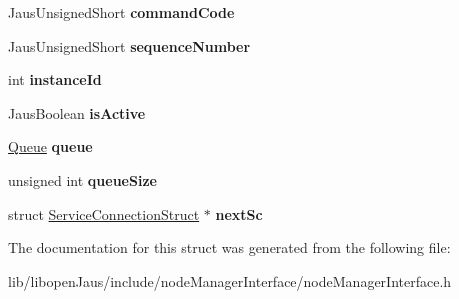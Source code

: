 \begin{DoxyCompactItemize}
\item 
\hypertarget{struct_service_connection_struct_aabae93750eda427abb7152ab75f2e4d8}{\-Jaus\-Unsigned\-Short {\bfseries command\-Code}}\label{struct_service_connection_struct_aabae93750eda427abb7152ab75f2e4d8}

\item 
\hypertarget{struct_service_connection_struct_a599d22302ffce585e3156e6d3fb9b4ba}{\-Jaus\-Unsigned\-Short {\bfseries sequence\-Number}}\label{struct_service_connection_struct_a599d22302ffce585e3156e6d3fb9b4ba}

\item 
\hypertarget{struct_service_connection_struct_a83b7c7983d23dc3258cbfa258f836c70}{int {\bfseries instance\-Id}}\label{struct_service_connection_struct_a83b7c7983d23dc3258cbfa258f836c70}

\item 
\hypertarget{struct_service_connection_struct_a9df8e6f305d4eadfffe175df1cb5ea23}{\-Jaus\-Boolean {\bfseries is\-Active}}\label{struct_service_connection_struct_a9df8e6f305d4eadfffe175df1cb5ea23}

\item 
\hypertarget{struct_service_connection_struct_a9639d7df66b1869a4359e7ed05fb8dcf}{\hyperlink{struct_queue_struct}{\-Queue} {\bfseries queue}}\label{struct_service_connection_struct_a9639d7df66b1869a4359e7ed05fb8dcf}

\item 
\hypertarget{struct_service_connection_struct_aea1b1da460cc5d5b72c0d73938c4f7c9}{unsigned int {\bfseries queue\-Size}}\label{struct_service_connection_struct_aea1b1da460cc5d5b72c0d73938c4f7c9}

\item 
\hypertarget{struct_service_connection_struct_a6013e3e8cf9dbc4b049a7db6319f1879}{struct \hyperlink{struct_service_connection_struct}{\-Service\-Connection\-Struct} $\ast$ {\bfseries next\-Sc}}\label{struct_service_connection_struct_a6013e3e8cf9dbc4b049a7db6319f1879}

\end{DoxyCompactItemize}


\-The documentation for this struct was generated from the following file\-:\begin{DoxyCompactItemize}
\item 
lib/libopen\-Jaus/include/node\-Manager\-Interface/node\-Manager\-Interface.\-h\end{DoxyCompactItemize}
